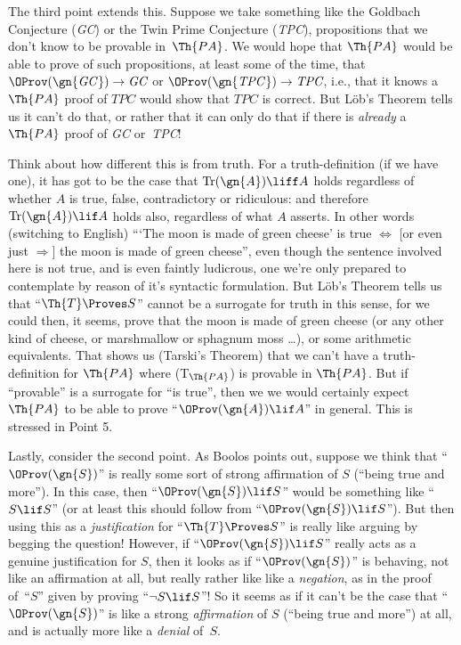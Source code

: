 The third point extends this. Suppose we take something like the
Goldbach Conjecture (\textit{GC\/}) or the Twin Prime Conjecture
(\textit{TPC\/}), propositions that we don't know to be provable
in~$\Th{PA}$. We would hope that $\Th{PA}$ would be able to prove of
such propositions, at least some of the time, that
$\OProv(\gn{\textit{GC\/}}) \to \textit{GC}$ or
$\OProv(\gn{\textit{TPC\/}}) \to \textit{TPC}$, i.e., that it knows a
$\Th{PA}$ proof of $\textit{TPC}$ would show that $\textit{TPC}$ is
correct. But L\"ob's Theorem tells us it can't do that, or rather that
it can only do that if there is \emph{already} a $\Th{PA}$ proof of
\textit{GC} or~\textit{TPC}!{}

Think about how different this is from truth. For a truth-definition
(if we have one), it has got to be the case that $\mathrm{Tr}(\gn{A})
\liff A$ holds regardless of whether $A$ is true, false, contradictory
or ridiculous: and therefore $\mathrm{Tr}(\gn{A}) \lif A$ holds  also,
regardless of what $A$ asserts. In other words (switching to English)
``{}`The moon is made of green cheese' is true $\Leftrightarrow$ [or
even just $\Rightarrow$]  the moon is made of green cheese'', even
though the sentence involved here is not true, and is even faintly
ludicrous, one we're only prepared to contemplate by reason of it's
syntactic formulation.  But L\"ob's Theorem tells us that ``$\Th{T}
\Proves S$'' cannot be a surrogate for truth in this sense, for we
could then, it seems,  prove that the moon is made of green cheese (or
any other kind of cheese, or marshmallow or sphagnum moss \dots), or
some arithmetic equivalents. That shows us (Tarski's Theorem) that we
can't have a truth-definition for $\Th{PA}$ where (T$_{\Th{PA}}$) is
provable in $\Th{PA}$. But if ``provable'' is a surrogate for ``is
true'', then we we would certainly expect $\Th{PA}$ to be able to
prove ``$\OProv(\gn{A}) \lif A$'' in general. This is stressed in
Point 5.

Lastly, consider the second point. As Boolos points out, suppose we
think that ``$\OProv(\gn{S})$'' is really some sort of strong
affirmation of $S$ (``being true and more''). In this case, then
``$\OProv(\gn{S}) \lif S$'' would be  something like ``$S \lif S$''
(or at least this should follow from ``$\OProv(\gn{S}) \lif S$'').
But then using this as a \emph{justification} for ``$\Th{T}\Proves S$''
is really like arguing by begging the question!{} However,  if
``$\OProv(\gn{S}) \lif S$'' really acts as a genuine justification
for $S$,  then it looks as if ``$\OProv(\gn{S})$'' is behaving,
not like an affirmation at all, but really rather like like a
\emph{negation}, as in the proof of~``$S$'' given by proving ``$\lnot S
\lif S$''!{} So it seems as if it can't be the case that
``$\OProv(\gn{S})$'' is like a strong \emph{affirmation} of $S$
(``being true and more'') at all, and is actually more like a
\emph{denial} of~$S$.
